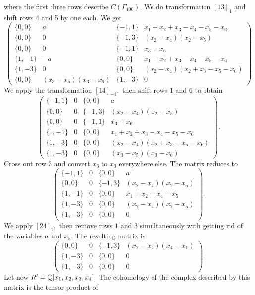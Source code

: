 \documentclass[12pt]{article}
\begin{document}
where the first three rows describe $C(\Gamma_{100}).$  
We do transformation $[13]_1$ and shift rows 4 and 5 by one each. 
We get 
$$ \left( \begin{array}{cccc}
 \{0,0\} & a & \{-1,1\} & x_1+x_2+x_3-x_4-x_5-x_6  \\
 \{0,0\} & 0 & \{-1,3\} & (x_2-x_4)(x_2-x_5) \\
 \{0,0\} & 0 & \{-1,1\} & x_3-x_6 \\
 \{1,-1\} & -a & \{0,0\} &   x_1+x_2+x_3-x_4-x_5-x_6 \\
 \{1,-3\} & 0 & \{0,0\} & (x_2-x_4)(x_2+x_3-x_5-x_6)   \\
 \{0,0\} &(x_3-x_5)(x_3-x_6) &  \{1,-3\} & 0 \end{array} \right) $$ 
We apply the transformation $[14]_{-1},$ then shift rows $1$ and $6$ 
to obtain  
$$ \left( \begin{array}{cccc}
 \{-1,1\} & 0 & \{0,0\} & a  \\
 \{0,0\} & 0 & \{-1,3\} & (x_2-x_4)(x_2-x_5) \\
 \{0,0\} & 0 & \{-1,1\} & x_3-x_6 \\
 \{1,-1\} & 0 & \{0,0\} &   x_1+x_2+x_3-x_4-x_5-x_6 \\
 \{1,-3\} & 0 & \{0,0\} & (x_2-x_4)(x_2+x_3-x_5-x_6)   \\
 \{1,-3\} & 0 & \{0,0\} & (x_3-x_5)(x_3-x_6) \end{array} \right). $$ 
Cross out row $3$ and convert $x_6$ to $x_3$ everywhere else. The 
matrix reduces to 
$$ \left( \begin{array}{cccc}
 \{-1,1\} & 0 & \{0,0\} & a  \\
 \{0,0\} & 0 & \{-1,3\} & (x_2-x_4)(x_2-x_5) \\
 \{1,-1\} & 0 & \{0,0\} &   x_1+x_2-x_4-x_5 \\
 \{1,-3\} & 0 & \{0,0\} & (x_2-x_4)(x_2-x_5)   \\
 \{1,-3\} & 0 & \{0,0\} & 0 \end{array} \right). $$ 
We apply $[24]_1,$ then remove rows $1$ and $3$ simultaneously 
with getting rid of the variables $a$ and $x_5.$ The resulting matrix is 
$$\left( \begin{array}{cccc}
 \{0,0\} & 0 & \{-1,3\} & (x_2-x_4)(x_4-x_1) \\
 \{1,-3\} & 0 & \{0,0\} & 0  \\
 \{1,-3\} & 0 & \{0,0\} & 0 \end{array} \right). $$
Let now $R'=\mathbb Q[x_1,x_2,x_3,x_4].$ The cohomology of the complex 
described by this matrix is the tensor product of 
\end{document}
